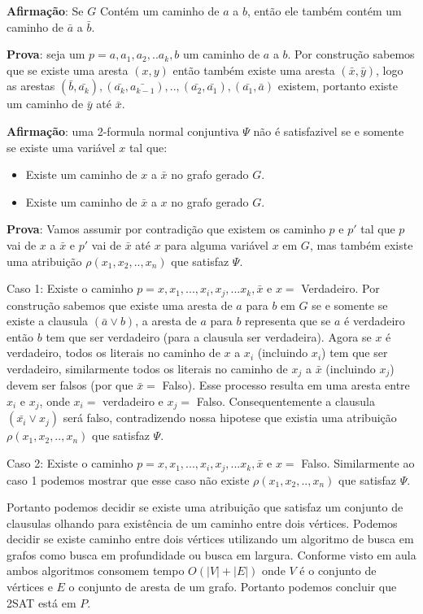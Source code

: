 \textbf{Afirmação}: Se $G$ Contém um caminho de $a$ a $b$, então ele também contém um caminho de $\bar{a}$ a $\bar{b}$.

\textbf{Prova}: seja um $p = a,a_1,a_2, .. a_k, b$ um caminho de $a$ a $b$. Por construção sabemos que se existe uma aresta  $(x,y)$ então também existe uma aresta $(\bar{x}, \bar{y})$, logo as arestas $(\bar{b}, \bar{a_k}), (\bar{a_k}, \bar{a_{k-1}}), .., (\bar{a_2}, \bar{a_1}), (\bar{a_1}, \bar{a})$ existem, portanto existe um caminho de $\bar{y}$ até $\bar{x}$.

\textbf{Afirmação}: uma 2-formula normal conjuntiva $\Psi$ não é satisfazivel se e somente se existe uma variável $x$ tal que:
\begin{itemize}
 \item Existe um caminho de $x$ a $\bar{x}$ no grafo gerado $G$.
 \item Existe um caminho de $\bar{x}$ a $x$ no grafo gerado $G$.
\end{itemize}

\textbf{Prova}: Vamos assumir por contradição que existem os caminho $p$ e $p'$ tal que $p$ vai de $x$ a $\bar{x}$ e $p'$ vai de $\bar{x}$ até $x$ para alguma variável $x$ em $G$, mas também existe uma atribuição $\rho(x_1, x_2, .., x_n)$ que satisfaz $\Psi$.

Caso 1: Existe o caminho $p = x, x_1, ..., x_i, x_j, ... x_k, \bar{x}$ e $x = $ Verdadeiro. Por construção sabemos que existe uma aresta de $a$ para $b$ em $G$ se e somente se existe a clausula $(\bar{a} \vee b)$, a aresta de $a$ para $b$ representa que se $a$ é verdadeiro então $b$  tem que ser verdadeiro (para a clausula ser verdadeira). Agora se $x$ é verdadeiro, todos os literais no caminho de $x$ a $x_i$ (incluindo $x_i$) tem que ser verdadeiro, similarmente todos os literais no caminho de $x_j$ a $\bar{x}$ (incluindo $x_j$) devem ser falsos (por que $\bar{x} =$ Falso). Esse processo resulta em uma aresta entre $x_i$ e $x_j$, onde $x_i = $ verdadeiro e $x_j = $ Falso. Consequentemente a clausula $(\bar{x_i} \vee x_j)$ será falso, contradizendo nossa hipotese que existia uma atribuição 
$\rho(x_1, x_2, .., x_n)$ que satisfaz $\Psi$.

Caso 2: Existe o caminho $p = x, x_1, ..., x_i, x_j, ... x_k, \bar{x}$ e $x = $ Falso. Similarmente ao caso 1 podemos mostrar que esse caso não existe $\rho(x_1, x_2, .., x_n)$ que satisfaz $\Psi$.

Portanto podemos decidir se existe uma atribuição que satisfaz um conjunto de clausulas olhando para existência de um caminho entre dois vértices. Podemos decidir se existe caminho entre dois vértices utilizando um algoritmo de busca em grafos como busca em profundidade ou busca em largura. Conforme visto em aula ambos algoritmos consomem tempo $O(|V| + |E|)$ onde $V$ é o conjunto de vértices e $E$ o conjunto de aresta de um grafo. Portanto podemos concluir que 2SAT está em $P$. \\[6pt]





